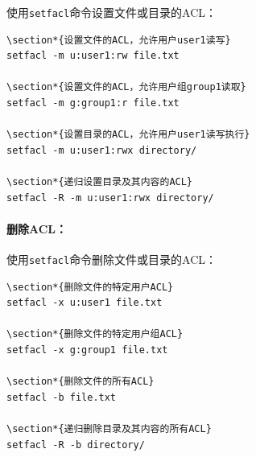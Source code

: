 \documentclass[12pt,UTF8]{ctexbook}
\begin{document}
使用\verb+setfacl+命令设置文件或目录的ACL：
\begin{verbatim}
\section*{设置文件的ACL，允许用户user1读写}
setfacl -m u:user1:rw file.txt

\section*{设置文件的ACL，允许用户组group1读取}
setfacl -m g:group1:r file.txt

\section*{设置目录的ACL，允许用户user1读写执行}
setfacl -m u:user1:rwx directory/

\section*{递归设置目录及其内容的ACL}
setfacl -R -m u:user1:rwx directory/
\end{verbatim}

\paragraph{删除ACL：}
使用\verb+setfacl+命令删除文件或目录的ACL：
\begin{verbatim}
\section*{删除文件的特定用户ACL}
setfacl -x u:user1 file.txt

\section*{删除文件的特定用户组ACL}
setfacl -x g:group1 file.txt

\section*{删除文件的所有ACL}
setfacl -b file.txt

\section*{递归删除目录及其内容的所有ACL}
setfacl -R -b directory/
\end{verbatim}
\end{document}
